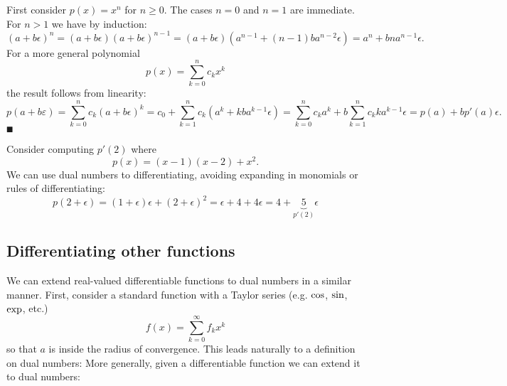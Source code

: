 First consider $p(x) = x^n$ for $n \ensuremath{\geq} 0$.  The cases $n = 0$ and $n = 1$ are immediate. For $n > 1$ we have by induction:
\[
(a + b \ensuremath{\epsilon})^n = (a + b \ensuremath{\epsilon}) (a + b \ensuremath{\epsilon})^{n-1} = (a + b \ensuremath{\epsilon}) (a^{n-1} + (n-1) b a^{n-2} \ensuremath{\epsilon}) = a^n + b n a^{n-1} \ensuremath{\epsilon}.
\]
For a more general polynomial
\[
p(x) = \ensuremath{\sum}_{k=0}^n c_k x^k
\]
the result follows from linearity:
\[
p(a + b \ensuremath{\varepsilon}) = \ensuremath{\sum}_{k=0}^n c_k (a+b\ensuremath{\epsilon})^k = c_0 + \ensuremath{\sum}_{k=1}^n c_k (a^k +k b a^{k-1}\ensuremath{\epsilon})
= \ensuremath{\sum}_{k=0}^n c_k a^k + b \ensuremath{\sum}_{k=1}^n c_k k a^{k-1}\ensuremath{\epsilon} = p(a) + b p'(a) \ensuremath{\epsilon}.
\]
\ensuremath{\QED}

\begin{example} Consider computing $p'(2)$ where
\[
p(x) = (x-1)(x-2) + x^2.
\]
We can use dual numbers to differentiating, avoiding expanding in monomials or rules of differentiating:
\[
p(2+\ensuremath{\epsilon}) = (1+\ensuremath{\epsilon})\ensuremath{\epsilon} + (2+\ensuremath{\epsilon})^2 = \ensuremath{\epsilon} + 4 + 4\ensuremath{\epsilon} = 4 + \underbrace{5}_{p'(2)}\ensuremath{\epsilon}
\]
\end{example}

\subsection{Differentiating other functions}
We can extend real-valued differentiable functions to dual numbers in a similar manner. First, consider a standard function with a Taylor series (e.g. ${\rm cos}$, ${\rm sin}$, ${\rm exp}$, etc.)
\[
f(x) = \ensuremath{\sum}_{k=0}^\ensuremath{\infty} f_k x^k
\]
so that $a$ is inside the radius of convergence. This leads naturally to a definition on dual numbers:
More generally, given a differentiable function we can extend it to dual numbers:

